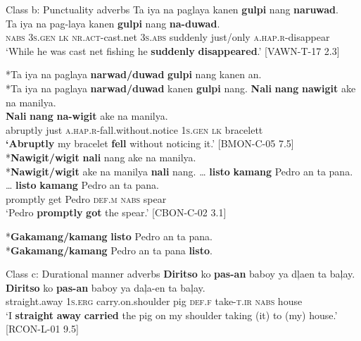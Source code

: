 \newpage
\ex Class b: Punctuality adverbs
\ea
Ta  iya  na  paglaya  kanen  \textbf{gulpi}  nang  \textbf{naruwad}. \\\smallskip
\gll Ta  iya  na  pag-laya  kanen  \textbf{gulpi}  nang  \textbf{na-duwad}. \\
\textsc{nabs}  3\textsc{s.gen}  \textsc{lk}  \textsc{nr.act}-cast.net  3\textsc{s.abs}  suddenly  just/only  \textsc{a.hap.r}-disappear \\
\glt ‘While he was cast net fishing he \textbf{suddenly} \textbf{disappeared}.’ [VAWN-T-17 2.3] \\\smallskip

*Ta iya na paglaya \textbf{narwad/duwad} \textbf{gulpi} nang kanen an. \\
*Ta iya na paglaya \textbf{narwad/duwad} kanen \textbf{gulpi} nang.
\ex
\label{bkm:Ref480616181}
\textbf{Nali}  \textbf{nang}  \textbf{nawigit}  ake  na  manilya. \\\smallskip
 \gll \textbf{Nali}  \textbf{nang}  \textbf{na-wigit}  ake  na  manilya. \\
abruptly  just  \textsc{a.hap.r}-fall.without.notice  1\textsc{s.gen}  \textsc{lk}  bracelett \\
\glt \textbf{‘Abruptly} my bracelet \textbf{fell} without noticing it.’ [BMON-C-05 7.5] \\
*\textbf{Nawigit/wigit} \textbf{nali} nang ake na manilya. \\
*\textbf{Nawigit/wigit} ake na manilya \textbf{nali} nang.
\ex
… \textbf{listo}  \textbf{kamang}  Pedro  an  ta  pana. \\\smallskip
 \gll … \textbf{listo}  \textbf{kamang}  Pedro  an  ta  pana. \\
{}  promptly  get    Pedro  \textsc{def.m}  \textsc{nabs}  spear \\
\glt ‘Pedro \textbf{promptly} \textbf{got} the spear.’ [CBON-C-02 3.1] \\\smallskip

*\textbf{Gakamang/kamang} \textbf{listo} Pedro an ta pana. \\
*\textbf{Gakamang/kamang} Pedro an ta pana \textbf{listo}.
\z


\ex Class c: Durational manner adverbs
\ea
\textbf{Diritso}  ko  \textbf{pas-an}  baboy  ya  dļaen ta    baļay. \\\smallskip
 \gll \textbf{Diritso}  ko  \textbf{pas-an}  baboy  ya  daļa-en ta    baļay. \\
straight.away  1\textsc{s.erg}  carry.on.shoulder  pig  \textsc{def.f}  take-\textsc{t.ir} \textsc{nabs}   house \\
\glt ‘I \textbf{straight} \textbf{away} \textbf{carried} the pig on my shoulder taking (it) to (my) house.’ [RCON-L-01 9.5] \\\smallskip

